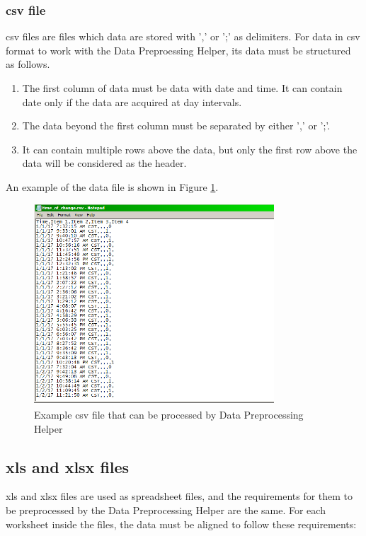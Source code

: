 \documentclass[12pt,a4paper]{article}
\begin{document}
\subsubsection{csv file}
\label{sec:csv-file}
csv files are files which data are stored with ',' or ';' as delimiters. For data in csv format to work with the Data Preproessing Helper, its data must be structured as follows.

\begin{enumerate}
\item The first column of data must be data with date and time. It can contain date only if the data are acquired at day intervals.
\item The data beyond the first column must be separated by either ',' or ';'.
\item It can contain multiple rows above the data, but only the first row above the data will be considered as the header.
\end{enumerate}

An example of the data file is shown in Figure \ref{fig:csv_file}.

\begin{figure}[H]
\centering
\includegraphics[width=0.8\textwidth]{csv-file.png}
\caption{Example csv file that can be processed by Data Preprocessing Helper}
\label{fig:csv_file}
\end{figure}

\subsection{xls and xlsx files}
xls and xlsx files are used as spreadsheet files, and the requirements for them to be preprocessed by the Data Preprocessing Helper are the same. For each worksheet inside the files, the data must be aligned to follow these requirements:
\end{document}
